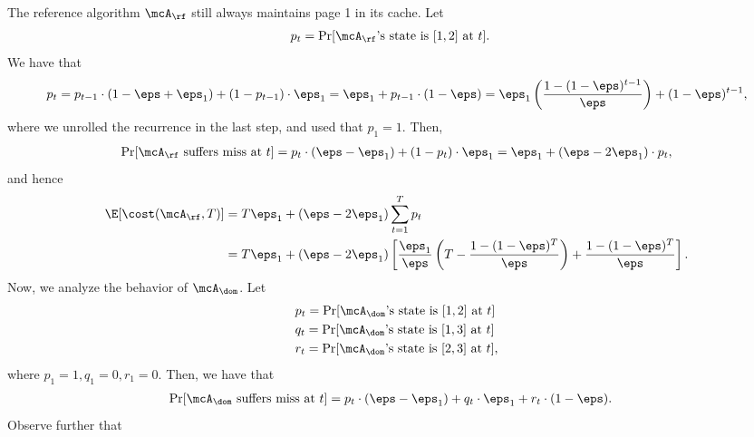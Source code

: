 \documentclass[11pt]{article}
\begin{document}
The reference algorithm $\mcA_\rf$ still always maintains page 1 in its cache. Let
\begin{align*}
    p_t &= \Pr[\text{$\mcA_\rf$'s state is $[1,2]$ at $t$}].
\end{align*}
We have that
\begin{align*}
    p_t = p_{t-1} \cdot (1-\eps+\eps_1) + (1-p_{t-1}) \cdot \eps_1 
    = \eps_1 + p_{t-1} \cdot (1-\eps) 
    = \eps_1 \left(\frac{1-(1-\eps)^{t-1}}{\eps}\right) + (1-\eps)^{t-1},
\end{align*}
where we unrolled the recurrence in the last step, and used that $p_1=1$. Then,
\begin{align*}
    \Pr[\mcA_\rf \text{ suffers miss at }t] = p_t \cdot (\eps-\eps_1) + (1-p_t) \cdot \eps_1
    = \eps_1 + (\eps-2\eps_1)\cdot p_t,
\end{align*}
and hence
\begin{align}
    \E[\cost(\mcA_\rf, T)] &= T\eps_1 + (\eps-2\eps_1) \sum_{t=1}^T p_t \nonumber \\
    &= T\eps_1 + (\eps-2\eps_1)\left[ \frac{\eps_1}{\eps}\left( T - \frac{1-(1-\eps)^T}{\eps} \right) + \frac{1-(1-\eps)^T}{\eps} \right]. \label{eqn:ref-gen-misses}
\end{align}
Now, we analyze the behavior of $\mcA_\dom$. Let
\begin{align*}
    &p_t = \Pr[\text{$\mcA_\dom$'s state is $[1,2]$ at $t$}] \\
    &q_t = \Pr[\text{$\mcA_\dom$'s state is $[1,3]$ at $t$}] \\
    &r_t = \Pr[\text{$\mcA_\dom$'s state is $[2,3]$ at $t$}],
\end{align*}
where $p_1=1, q_1=0, r_1=0$. Then, we have that
\begin{align}
    \label{eqn:miss-eqn}
    \Pr[\mcA_\dom \text{ suffers miss at }t] &= p_t \cdot (\eps-\eps_1) + q_t \cdot \eps_1 + r_t \cdot (1-\eps).
\end{align}
 Observe further that
\end{document}
